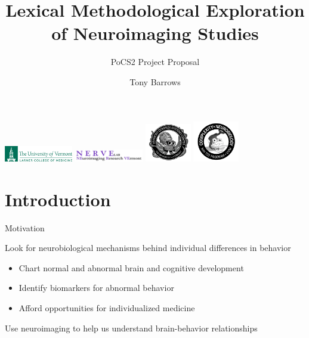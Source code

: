 \documentclass[aspectratio=169]{beamer}
\title[Brainwise Wordsearch]{Lexical Methodological Exploration of Neuroimaging Studies}
\subtitle[]{PoCS2 Project Proposal}
\date{}
\author[Tony Barrows]{Tony Barrows}
\begin{document}
	
	\begin{frame}
		\maketitle
		
		\centering
		\includegraphics[width=3cm]{larner}
		\includegraphics[width=3cm]{nerve}
		\includegraphics[width=2cm]{complexsystems}
		\includegraphics[width=2cm]{complexbrain}
	\end{frame}
	

\section{Introduction}


\begin{frame}{Motivation}

	Look for neurobiological mechanisms behind individual differences in behavior
	
	\begin{itemize}
		\item Chart normal and abnormal brain and cognitive development
		\item Identify biomarkers for abnormal behavior
		\item Afford opportunities for individualized medicine
	\end{itemize}
	
	\pause
	\begin{block}{}
		Use neuroimaging to help us understand brain-behavior relationships
	\end{block}
\end{frame}
\end{document}

